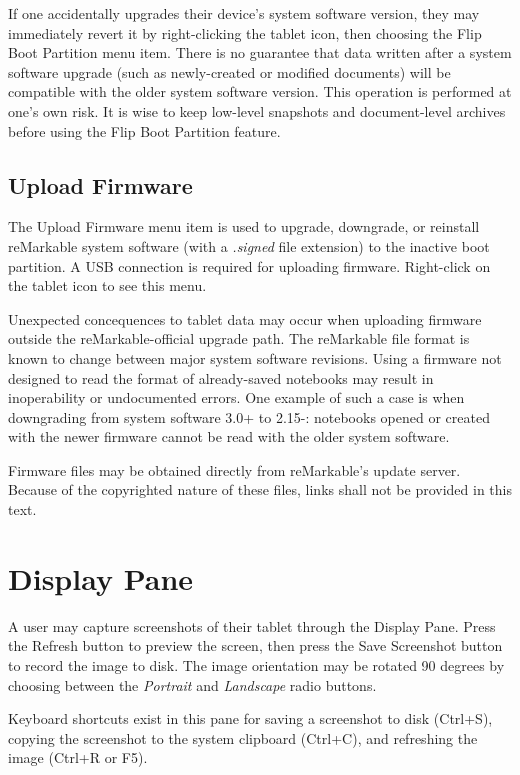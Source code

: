 If one accidentally upgrades their device's system software version, they may immediately revert it by right-clicking the tablet icon, then choosing the Flip Boot Partition menu item. There is no guarantee that data written after a system software upgrade (such as newly-created or modified documents) will be compatible with the older system software version. This operation is performed at one's own risk. It is wise to keep low-level snapshots and document-level archives before using the Flip Boot Partition feature.


\subsection{Upload Firmware}
The Upload Firmware menu item is used to upgrade, downgrade, or reinstall reMarkable system software (with a \textit{.signed} file extension) to the inactive boot partition. A USB connection is required for uploading firmware. Right-click on the tablet icon to see this menu.

Unexpected concequences to tablet data may occur when uploading firmware outside the reMarkable-official upgrade path. The reMarkable file format is known to change between major system software revisions. Using a firmware not designed to read the format of already-saved notebooks may result in inoperability or undocumented errors. One example of such a case is when downgrading from system software 3.0+ to 2.15-: notebooks opened or created with the newer firmware cannot be read with the older system software.

Firmware files may be obtained directly from reMarkable's update server. Because of the copyrighted nature of these files, links shall not be provided in this text.




\newpage
\section{Display Pane}
\label{sec:displaypane}
A user may capture screenshots of their tablet through the Display Pane. Press the Refresh button to preview the screen, then press the Save Screenshot button to record the image to disk. The image orientation may be rotated 90 degrees by choosing between the \textit{Portrait} and \textit{Landscape} radio buttons.

Keyboard shortcuts exist in this pane for saving a screenshot to disk (Ctrl+S), copying the screenshot to the system clipboard (Ctrl+C), and refreshing the image (Ctrl+R or F5).

